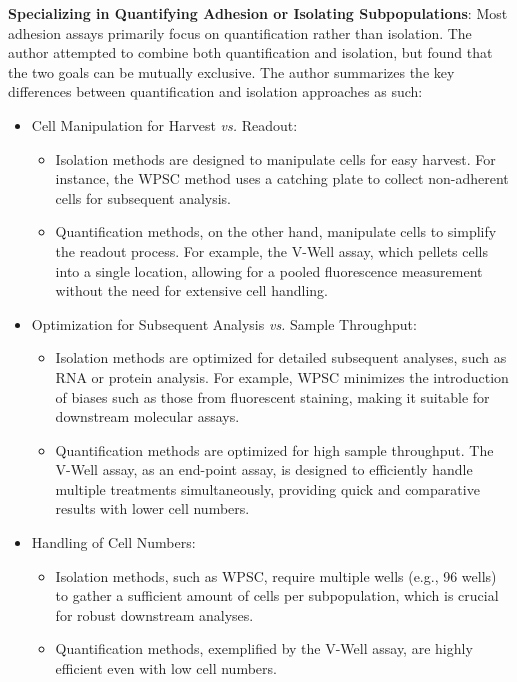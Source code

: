 \textbf{Specializing in Quantifying Adhesion or Isolating Subpopulations}: Most
adhesion assays primarily focus on quantification rather than isolation. The
author attempted to combine both quantification and isolation, but found that
the two goals can be mutually exclusive. The author summarizes the key
differences between quantification and isolation approaches as such:

\begin{itemize}
      \item Cell Manipulation for Harvest \textit{vs.} Readout:
            \begin{itemize}
                  \item Isolation methods are designed to manipulate cells for easy
                        harvest. For instance, the \ac{WPSC} method uses a catching
                        plate to collect non-adherent cells for subsequent analysis.
                  \item Quantification methods, on the other hand, manipulate cells
                        to simplify the readout process. For example, the V-Well
                        assay, which pellets cells into a single location, allowing
                        for a pooled fluorescence measurement without the need for
                        extensive cell handling.
            \end{itemize}

      \item Optimization for Subsequent Analysis \textit{vs.} Sample Throughput:
            \begin{itemize}
                  \item Isolation methods are optimized for detailed subsequent
                        analyses, such as RNA or protein analysis. For example,
                        \ac{WPSC} minimizes the introduction of biases such as those
                        from fluorescent staining, making it suitable for downstream
                        molecular assays.
                  \item Quantification methods are optimized for high sample
                        throughput. The V-Well assay, as an end-point assay, is
                        designed to efficiently handle multiple treatments
                        simultaneously, providing quick and comparative results with
                        lower cell numbers.
            \end{itemize}
      \item Handling of Cell Numbers:
            \begin{itemize}
                  \item Isolation methods, such as \ac{WPSC}, require multiple wells
                        (e.g., 96 wells) to gather a sufficient amount of cells per
                        subpopulation, which is crucial for robust downstream
                        analyses.
                  \item Quantification methods, exemplified by the V-Well assay, are
                        highly efficient even with low cell numbers.
            \end{itemize}
\end{itemize}



